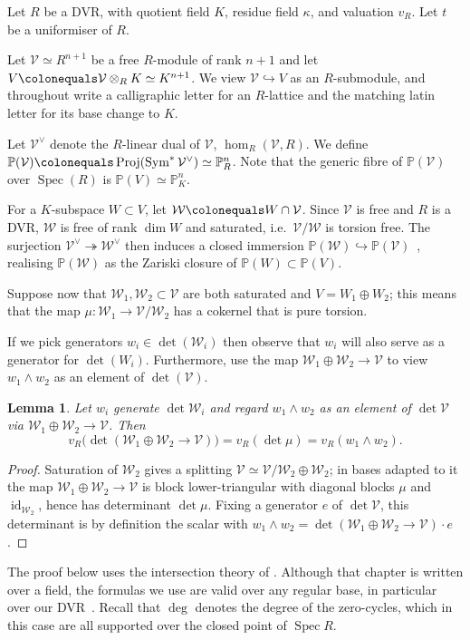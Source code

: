 \documentclass[11pt,a4paper]{amsart}
\newcommand{\Pp}{\mathbb{P}}
\newcommand{\pn}{\mathbb{P}^{n}}
\DeclareMathOperator{\proj}{Proj}
\DeclareMathOperator{\Spec}{Spec}
\DeclareMathOperator{\Sym}{Sym}
\theoremstyle{plain}
\newtheorem{lemma}[theorem]{Lemma}
\theoremstyle{definition}
\theoremstyle{remark}
\DeclareMathOperator{\id}{id}
\newcommand{\cw}{\mathcal{W}}
\newcommand{\cv}{\mathcal{V}}
\newcommand{\tos}{\twoheadrightarrow}
\newcommand{\toi}{\hookrightarrow}
\newcommand{\coleq}{\colonequals}
\begin{document}
\medskip

Let $R$ be a DVR, with quotient field $K$, residue field $\kappa$, and valuation $v_R$. Let $t$ be a uniformiser of $R$.

Let $\cv \simeq R^{n+1}$ be a free $R$-module of rank $n+1$ and let $V \coleq \cv \otimes_R K \simeq K^{n+1}$. We view $\cv \toi V$ as an $R$-submodule, and throughout write a calligraphic letter for an $R$-lattice and the matching latin letter for its base change to $K$.

Let $\cv^\vee$ denote the $R$-linear dual of $\cv$, $\hom_R(\cv,R)$. We define $\Pp(\cv) \coleq \proj(\Sym^* \cv^\vee) \simeq \pn_R$. Note that the generic fibre of $\Pp(\cv)$ over $\Spec(R)$ is $\Pp(V) \simeq \pn_K$.

For a $K$-subspace $W \subset V$, let $\cw \coleq W \cap \cv$. Since $\cv$ is free and $R$ is a DVR, $\cw$ is free of rank $\dim W$ and saturated, i.e.\ $\cv/\cw$ is torsion free. The surjection $\cv^\vee \tos \cw^\vee$ then induces a closed immersion $\Pp(\cw) \toi \Pp(\cv)$~\cite[Tag~01N1]{stacks-project}, realising $\Pp(\cw)$ as the Zariski closure of $\Pp(W) \subset \Pp(V)$.

Suppose now that $\cw_1, \cw_2 \subset \cv$ are both saturated and $V = W_1 \oplus W_2$; this means that the map $\mu \colon \cw_1 \to \cv/\cw_2$ has a cokernel that is pure torsion.

If we pick generators $w_i \in \det(\cw_i)$ then observe that $w_i$ will also serve as a generator for $\det(W_i)$. Furthermore, use the map $\cw_1 \oplus \cw_2 \to \cv$ to view $w_1 \wedge w_2$ as an element of $\det(\cv)$.

\begin{lemma}\label{lem:wedge-det}
  Let $w_i$ generate $\det \cw_i$ and regard $w_1\wedge w_2$ as an element of $\det \cv$ via $\cw_1\oplus\cw_2 \to \cv$. Then
  \[
    v_R\big(\det(\cw_1\oplus\cw_2 \to \cv)\big) = v_R(\det \mu) = v_R(w_1\wedge w_2).
  \]
\end{lemma}
\begin{proof}
  Saturation of $\cw_2$ gives a splitting $\cv \simeq \cv/\cw_2 \oplus \cw_2$; in bases adapted to it the map $\cw_1\oplus\cw_2 \to \cv$ is block lower-triangular with diagonal blocks $\mu$ and $\id_{\cw_2}$, hence has determinant $\det\mu$. Fixing a generator $e$ of $\det \cv$, this determinant is by definition the scalar with $w_1\wedge w_2 = \det(\cw_1\oplus\cw_2 \to \cv)\cdot e$.
\end{proof} 


The proof below uses the intersection theory of \cite[Ch.~14]{Fulton1998}. Although that chapter is written over a field, the formulas we use are valid over any regular base, in particular over our DVR~\cite[p.~395]{Fulton1998}. Recall that $\deg$ denotes the degree of the zero-cycles, which in this case are all supported over the closed point of $\Spec R$.
\end{document}
